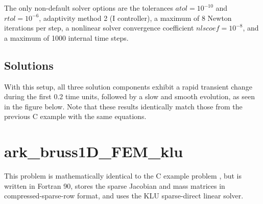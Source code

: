 \documentclass[letterpaper,10pt,english]{sphinxmanual}
\begin{document}
The only non-default solver options are the tolerances
\(atol=10^{-10}\) and \(rtol=10^{-6}\), adaptivity method 2 (I
controller), a maximum of 8 Newton iterations per step, a nonlinear
solver convergence coefficient \(nlscoef=10^{-8}\), and a maximum
of 1000 internal time steps.


\subsection{Solutions}
\label{f90_serial:solutions}
With this setup, all three solution components exhibit a rapid
transient change during the first 0.2 time units, followed by a slow
and smooth evolution, as seen in the figure below.  Note that these
results identically match those from the previous C example with the
same equations.
\begin{figure}[htbp]
\centering

\end{figure}


\section{ark\_bruss1D\_FEM\_klu}
\label{f90_serial:ark-bruss1d-fem-klu}\label{f90_serial:id2}
This problem is mathematically identical to the C example problem
{\hyperref[c_serial:ark-brusselator1d-fem-slu]{\emph{}}}, but is written in Fortran 90, stores
the sparse Jacobian and mass matrices in compressed-sparse-row format,
and uses the KLU sparse-direct linear solver.
\end{document}
